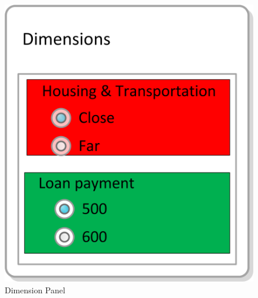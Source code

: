 \documentclass[conference]{IEEEtran}
\newcommand{\figscale}{0.6}
\begin{document}
\begin{figure}
\centering
\includegraphics[scale=\figscale]{img/dimension_panel}
\caption{Dimension Panel}
\label{fig:dimension_panel}
\end{figure}
\end{document}
